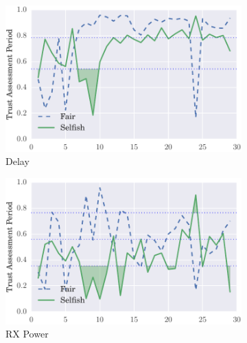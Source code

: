 \documentclass[runningheads,a4paper]{llncs}
\begin{document}
\begin{figure}
\begin{subfigure}{0.32\textwidth}
  \centering
  \includegraphics[width=.95\linewidth]{img/trust_bella_allbut1_mobile_emph_ADelay_BadMouthingPowerControl.pdf}
  \caption{Delay}
  \label{fig:allbut1_mobile_badmouthing_delay}
\end{subfigure}
\begin{subfigure}{0.32\textwidth}
\centering
  \includegraphics[width=.95\linewidth]{img/trust_bella_allbut1_mobile_emph_ARXP_BadMouthingPowerControl.pdf}
  \caption{RX Power}
  \label{fig:allbut1_mobile_badmouthing_rxp}
\end{subfigure}
\begin{subfigure}{0.32\textwidth}
\centering

\end{subfigure}
\end{figure}
\end{document}
